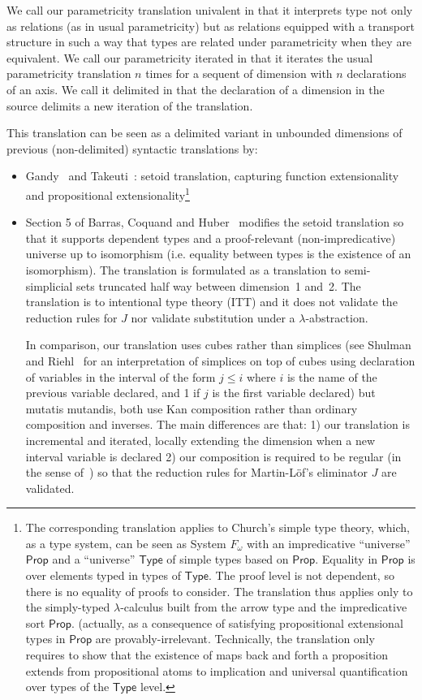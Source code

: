 \documentclass{article}
\begin{document}
We call our parametricity translation univalent in that it interprets
type not only as relations (as in usual parametricity) but as
relations equipped with a transport structure in such a way that types
are related under parametricity when they are equivalent. We call our
parametricity iterated in that it iterates the usual parametricity
translation $n$ times for a sequent of dimension with $n$ declarations
of an axis. We call it delimited in that the declaration of a
dimension in the source delimits a new iteration of the translation.

This translation can be seen as a delimited variant in unbounded
dimensions of previous (non-delimited) syntactic translations by:
\begin{itemize}
\item Gandy~\cite{Gandy56} and Takeuti~\cite{Takeuti57}: setoid
  translation, capturing function extensionality and propositional
  extensionality\footnote{The corresponding translation applies to Church's
  simple type theory, which, as a type system, can be seen as System
  $F_{\omega}$ with an impredicative ``universe'' $\mathsf{Prop}$ and
  a ``universe'' $\mathsf{Type}$ of simple types based on
  $\mathsf{Prop}$. Equality in $\mathsf{Prop}$ is over elements typed
  in types of $\mathsf{Type}$. The proof level is not dependent, so
  there is no equality of proofs to consider. The translation thus
  applies only to the simply-typed $\lambda$-calculus built from the
  arrow type and the impredicative sort $\mathsf{Prop}$. (actually, as
  a consequence of satisfying propositional extensional types in
  $\mathsf{Prop}$ are provably-irrelevant. Technically, the
  translation only requires to show that the existence of maps back
  and forth a proposition extends from propositional atoms to
  implication and universal quantification over types of the
  $\mathsf{Type}$ level.}
\item Section 5 of Barras, Coquand and
  Huber~\cite{BarrasCoquandHuber15} modifies the setoid translation so
  that it supports dependent types and a proof-relevant
  (non-impredicative) universe up to isomorphism (i.e. equality
  between types is the existence of an isomorphism). The translation
  is formulated as a translation to semi-simplicial sets truncated half
  way between dimension~1 and~2.
  The
  translation is to intentional type theory (ITT) and it does not
  validate the reduction rules for $J$ nor validate substitution under a
  $\lambda$-abstraction.

  In comparison, our translation uses cubes rather than simplices (see
  Shulman and Riehl~\cite{} for an interpretation of simplices on top
  of cubes using declaration of variables in the interval of the form
  $j \leq i$ where $i$ is the name of the previous variable declared,
  and 1 if $j$ is the first variable declared) but mutatis mutandis,
  both use Kan composition rather than ordinary composition and
  inverses. The main differences are that: 1) our translation is
  incremental and iterated, locally extending the dimension when a new
  interval variable is declared 2) our composition is required to be
  regular (in the sense of~\cite[Section 10]{CohCoqHubMor16}) so that
  the reduction rules for Martin-Löf's eliminator $J$ are validated.


\end{itemize}
\end{document}
